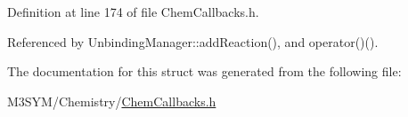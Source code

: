 Definition at line 174 of file Chem\+Callbacks.\+h.



Referenced by Unbinding\+Manager\+::add\+Reaction(), and operator()().



The documentation for this struct was generated from the following file\+:\begin{DoxyCompactItemize}
\item 
M3\+S\+Y\+M/\+Chemistry/\hyperlink{ChemCallbacks_8h}{Chem\+Callbacks.\+h}\end{DoxyCompactItemize}
